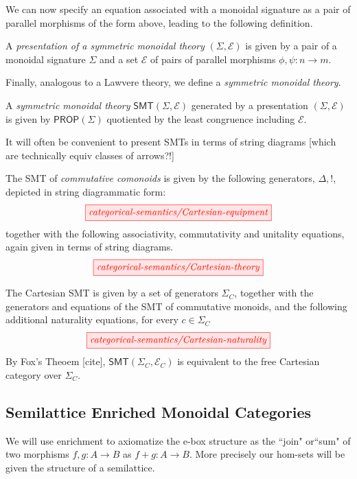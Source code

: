 We can now specify an equation associated with a monoidal signature as a pair of parallel morphisms of the form above, leading to the following definition.
\begin{definition}
A \textit{presentation of a symmetric monoidal theory} $(\Sigma, \mathcal{E})$ is given by a pair of a monoidal signature $\Sigma$ and a set $\mathcal{E}$ of pairs of parallel morphisms $\phi,\psi: n \to m$. 
\end{definition}
Finally, analogous to a Lawvere theory, we define a \textit{symmetric monoidal theory}. 
\begin{definition}
A \textit{symmetric monoidal theory} $\textsf{SMT}(\Sigma,\mathcal{E})$ generated by a presentation $(\Sigma, \mathcal{E})$ is given by $\textsf{PROP}(\Sigma)$ quotiented by the least congruence including $\mathcal{E}$.
\end{definition}

It will often be convenient to present SMTs in terms of string diagrams [which are technically equiv classes of arrows?!] 
\begin{example}
The SMT of \textit{commutative comonoids} is given by the following generators, ${\Delta, !}$, depicted in string diagrammatic form:
\[
    \tikzfig{categorical-semantics/Cartesian-equipment}
\]
together with the following associativity, commutativity and unitality equations, again given in terms of string diagrams. 
\[
    \tikzfig{categorical-semantics/Cartesian-theory}
\]
\end{example}

\begin{example}
The Cartesian SMT is given by a set of generators $\Sigma_C$, together with the generators and equations of the SMT of commutative monoids, and the following additional naturality equations, for every $c \in \Sigma_C$
\[
    \tikzfig{categorical-semantics/Cartesian-naturality}
\]
By Fox's Theoem [cite],  $\textsf{SMT}(\Sigma_C, \mathcal{E}_C)$ is equivalent to the free Cartesian category over $\Sigma_C$. 
\end{example}

\subsection{Semilattice Enriched Monoidal Categories}

We will use enrichment to axiomatize the e-box structure as the ``join" or``sum" of two morphisms $f,g: A \to B$ as $f + g: A \to B$.  More precisely our hom-sets will be given the structure of a semilattice.  


